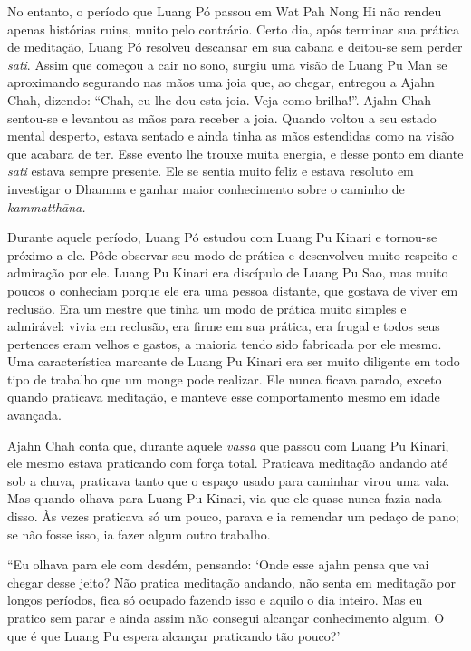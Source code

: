 No entanto, o período que Luang Pó passou em Wat Pah Nong Hi não rendeu
apenas histórias ruins, muito pelo contrário. Certo dia, após terminar
sua prática de meditação, Luang Pó resolveu descansar em sua cabana e
deitou-se sem perder \emph{sati}. Assim que começou a cair no sono,
surgiu uma visão de Luang Pu Man se aproximando segurando nas mãos uma
joia que, ao chegar, entregou a Ajahn Chah, dizendo: ``Chah, eu lhe dou
esta joia. Veja como brilha!''. Ajahn Chah sentou-se e levantou as mãos
para receber a joia. Quando voltou a seu estado mental desperto, estava
sentado e ainda tinha as mãos estendidas como na visão que acabara de
ter. Esse evento lhe trouxe muita energia, e desse ponto em diante
\emph{sati} estava sempre presente. Ele se sentia muito feliz e estava
resoluto em investigar o Dhamma e ganhar maior conhecimento sobre o
caminho de \emph{kammatthāna.}

Durante aquele período, Luang Pó estudou com Luang Pu Kinari e tornou-se
próximo a ele. Pôde observar seu modo de prática e desenvolveu muito
respeito e admiração por ele. Luang Pu Kinari era discípulo de Luang Pu
Sao, mas muito poucos o conheciam porque ele era uma pessoa distante,
que gostava de viver em reclusão. Era um mestre que tinha um modo de
prática muito simples e admirável: vivia em reclusão, era firme em sua
prática, era frugal e todos seus pertences eram velhos e gastos, a
maioria tendo sido fabricada por ele mesmo. Uma característica marcante
de Luang Pu Kinari era ser muito diligente em todo tipo de trabalho que
um monge pode realizar. Ele nunca ficava parado, exceto quando praticava
meditação, e manteve esse comportamento mesmo em idade avançada.

Ajahn Chah conta que, durante aquele \emph{vassa} que passou com Luang
Pu Kinari, ele mesmo estava praticando com força total. Praticava
meditação andando até sob a chuva, praticava tanto que o espaço usado
para caminhar virou uma vala. Mas quando olhava para Luang Pu Kinari,
via que ele quase nunca fazia nada disso. Às vezes praticava só um
pouco, parava e ia remendar um pedaço de pano; se não fosse isso, ia
fazer algum outro trabalho.

``Eu olhava para ele com desdém, pensando: `Onde esse ajahn pensa que
vai chegar desse jeito? Não pratica meditação andando, não senta em
meditação por longos períodos, fica só ocupado fazendo isso e aquilo o
dia inteiro. Mas eu pratico sem parar e ainda assim não consegui
alcançar conhecimento algum. O que é que Luang Pu espera alcançar
praticando tão pouco?'

